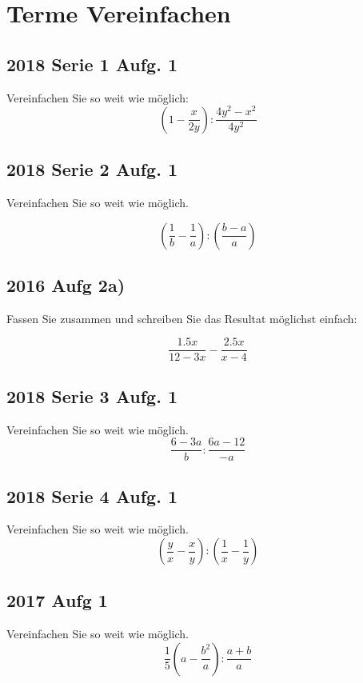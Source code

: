 



\usepackage{amssymb} %
\renewcommand{\metaHeaderLine}{Arbeitsblatt}
\renewcommand{\arbeitsblattTitel}{Gemischte Aufgaben aus alten Maturaprüfungen}

\arbeitsblattHeader{}
\section{Terme Vereinfachen}
\subsection{2018 Serie 1 Aufg. 1}

Vereinfachen Sie so weit wie möglich:
$$\left(1-\frac{x}{2y}\right) : \frac{4y^2-x^2}{4y^2}$$

\subsection{2018 Serie 2 Aufg. 1}
Vereinfachen Sie so weit wie möglich.

$$\left(\frac{1}{b}-\frac{1}{a}\right) : \left( \frac{b-a}{a}\right)$$


\subsection{2016 Aufg 2a)}
Fassen Sie zusammen und schreiben Sie das Resultat möglichst einfach:

$$\frac{1.5x}{12-3x} - \frac{2.5x}{x-4}$$

\subsection{2018 Serie 3 Aufg. 1}
Vereinfachen Sie so weit wie möglich.
$$\frac{6-3a}{b} : \frac{6a-12}{-a}$$

\subsection{2018 Serie 4 Aufg. 1}
Vereinfachen Sie so weit wie möglich.
$$\left(\frac{y}{x}  - \frac{x}{y} \right) : \left( \frac{1}{x} - \frac{1}{y} \right) $$


\subsection{2017 Aufg 1}
Vereinfachen Sie so weit wie möglich.
$$\frac{1}{5}\left( a-\frac{b^2}{a}\right): \frac{a+b}{a}$$

